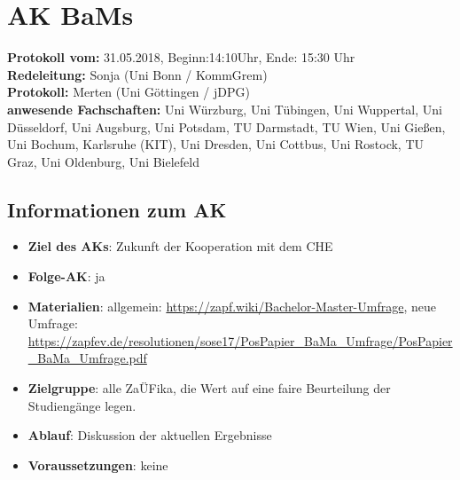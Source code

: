 
\section{AK BaMs}

	\textbf{Protokoll vom:} 31.05.2018,
	Beginn:14:10Uhr,
	Ende: 15:30 Uhr \\
	\textbf{Redeleitung:} Sonja (Uni Bonn / KommGrem) \\
	\textbf{Protokoll:} Merten (Uni Göttingen / jDPG) \\
	\textbf{anwesende Fachschaften:} Uni Würzburg, Uni Tübingen, Uni Wuppertal, Uni Düsseldorf, Uni Augsburg, Uni Potsdam, TU Darmstadt, TU Wien, Uni Gießen, Uni Bochum, Karlsruhe (KIT), Uni Dresden, Uni Cottbus, Uni Rostock, TU Graz, Uni Oldenburg, Uni Bielefeld

	\subsection*{Informationen zum AK}
		\begin{itemize}
			\item \textbf{Ziel des AKs}: Zukunft der Kooperation mit dem CHE
			\item \textbf{Folge-AK}: ja
      \item \textbf{Materialien}: allgemein: \url{https://zapf.wiki/Bachelor-Master-Umfrage}, neue Umfrage: \url{https://zapfev.de/resolutionen/sose17/PosPapier_BaMa_Umfrage/PosPapier_BaMa_Umfrage.pdf}
			\item \textbf{Zielgruppe}: alle ZaÜFika, die Wert auf eine faire Beurteilung der Studiengänge legen.
			\item \textbf{Ablauf}: Diskussion der aktuellen Ergebnisse
			\item \textbf{Voraussetzungen}: keine
		\end{itemize}

